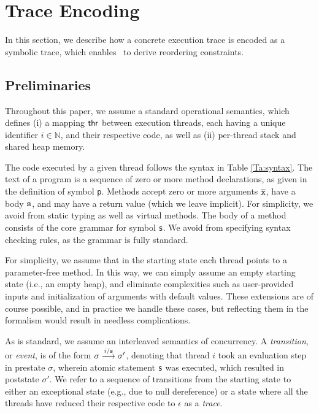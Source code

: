 \section{Trace Encoding}


In this section, we describe how a concrete execution trace is encoded as a symbolic trace, which enables \tool\ to 
derive reordering constraints.

\subsection{Preliminaries}

Throughout this paper, we assume a standard operational semantics, which defines (i) a mapping ${\sf thr}$ between
execution threads, each having a unique identifier $i \in \mathbb{N}$, and their respective code, as well as (ii) per-thread stack and shared heap memory. 

The code executed by a given thread follows the syntax in Table \ref{Ta:syntax}. The text of a program is a sequence of zero or more method declarations, as given in the definition of symbol {\tt p}. Methods accept zero or more arguments $\overline{{\tt x}}$, have a body ${\tt s}$, and may have a return value (which we leave implicit). For simplicity, we avoid from static typing as well as virtual methods. The body of a method consists of the core grammar for symbol {\tt s}. We avoid from specifying syntax checking rules, as the grammar is fully standard.

For simplicity, we assume that in the starting state each thread points to a parameter-free method. In this way, we can simply assume an empty starting state (i.e., an empty heap), and eliminate complexities such as user-provided inputs and initialization of arguments with default values. These extensions are of course possible, and in practice we handle these cases, but reflecting them in the formalism would result in needless complications.

As is standard, we assume an interleaved semantics of concurrency. A \emph{transition}, or \emph{event}, is of the form
$\sigma \stackrel{i / {\tt s}}{\longrightarrow} \sigma'$, denoting that thread $i$ took an evaluation step
in prestate $\sigma$, wherein atomic
statement {\tt s} was executed, which resulted in poststate $\sigma'$. We refer to a sequence of transitions from
the starting state to either an exceptional state (e.g., due to null dereference) or a state where all the threads have 
reduced their respective code to $\epsilon$ as a \emph{trace}.

